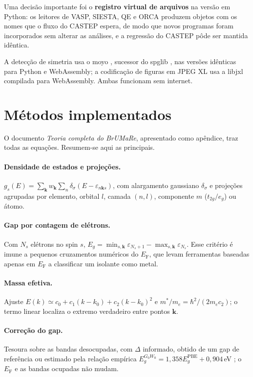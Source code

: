 Uma decisão importante foi o \textbf{registro virtual de arquivos} na versão em Python: os leitores de VASP, SIESTA, QE e ORCA produzem objetos com os nomes que o fluxo do CASTEP espera, de modo que novos programas foram incorporados sem alterar as análises, e a regressão do CASTEP pôde ser mantida idêntica.

A detecção de simetria usa o moyo \cite{moyo}, sucessor do spglib \cite{togo2024spglib}, nas versões idênticas para Python e WebAssembly; a codificação de figuras em JPEG XL usa a libjxl compilada para WebAssembly. Ambas funcionam sem internet.

\section{Métodos implementados}

O documento \emph{Teoria completa do BrUMaRe}, apresentado como apêndice, traz todas as equações. Resumem-se aqui as principais.

\paragraph{Densidade de estados e projeções.} $g_s(E)=\sum_{\mathbf k}w_{\mathbf k}\sum_n\delta_\sigma(E-\varepsilon_{n\mathbf k s})$, com alargamento gaussiano $\delta_\sigma$ e projeções agrupadas por elemento, orbital $l$, camada $(n,l)$, componente $m$ ($t_{2g}/e_g$) ou átomo.

\paragraph{Gap por contagem de elétrons.} Com $N_s$ elétrons no spin $s$, $E_g=\min_{s,\mathbf k}\varepsilon_{N_s+1}-\max_{s,\mathbf k}\varepsilon_{N_s}$. Esse critério é imune a pequenos cruzamentos numéricos do $E_\mathrm F$, que levam ferramentas baseadas apenas em $E_\mathrm F$ a classificar um isolante como metal.

\paragraph{Massa efetiva.} Ajuste $E(k)\simeq c_0+c_1(k-k_0)+c_2(k-k_0)^2$ e $m^*/m_e=\hbar^2/(2m_ec_2)$; o termo linear localiza o extremo verdadeiro entre pontos $\mathbf k$.

\paragraph{Correção do gap.} Tesoura \cite{levine1989} sobre as bandas desocupadas, com $\Delta$ informado, obtido de um gap de referência ou estimado pela relação empírica $E_g^{G_0W_0}=1{,}358E_g^\mathrm{PBE}+0{,}904$\,eV \cite{morales2017}; o $E_\mathrm F$ e as bandas ocupadas não mudam.

